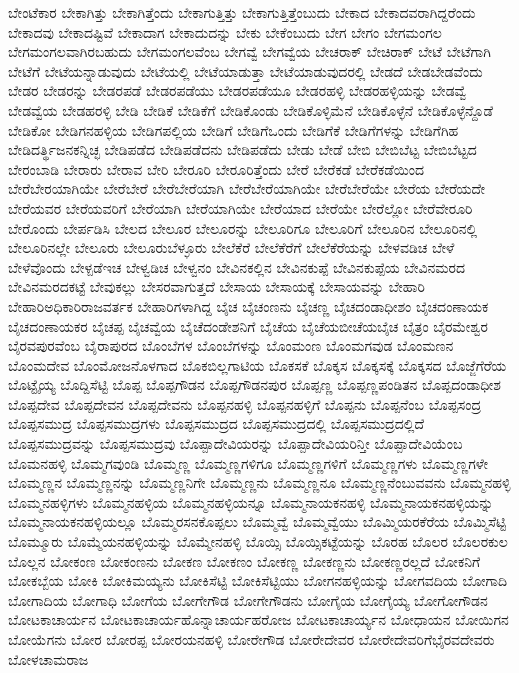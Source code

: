 {ಬೇಂಟೆಕಾರ
ಬೇಕಾಗಿತ್ತು
ಬೇಕಾಗಿತ್ತೆಂದು
ಬೇಕಾಗುತ್ತಿತ್ತು
ಬೇಕಾಗುತ್ತಿತ್ತೆಂಬುದು
ಬೇಕಾದ
ಬೇಕಾದವರಾಗಿದ್ದರೆಂದು
ಬೇಕಾದವು
ಬೇಕಾದಷ್ಟಿವೆ
ಬೇಕಾದಾಗ
ಬೇಕಾದುದನ್ನು
ಬೇಕು
ಬೇಕೆಂಬುದು
ಬೇಗ
ಬೇಗಂ
ಬೇಗಮಂಗಲ
ಬೇಗಮಂಗಲವಾಗಿರಬಹುದು
ಬೇಗಮಂಗಲವೆಂಬ
ಬೇಗವ್ವೆ
ಬೇಗವ್ವೆಯ
ಬೇಚರಾಕ್
ಬೇಚಿರಾಕ್
ಬೇಟೆ
ಬೇಟೆಗಾಗಿ
ಬೇಟೆಗೆ
ಬೇಟೆಯನ್ನಾಡುವುದು
ಬೇಟೆಯಲ್ಲಿ
ಬೇಟೆಯಾಡುತ್ತಾ
ಬೇಟೆಯಾಡುವುದರಲ್ಲಿ
ಬೇಡದೆ
ಬೇಡಬೇಡವೆಂದು
ಬೇಡರ
ಬೇಡರನ್ನು
ಬೇಡರಪಡೆ
ಬೇಡರಪಡೆಯು
ಬೇಡರಪಡೆಯೂ
ಬೇಡರಹಳ್ಳಿ
ಬೇಡರಹಳ್ಳಿಯನ್ನು
ಬೇಡವ್ವೆ
ಬೇಡವ್ವೆಯ
ಬೇಡಹರಳ್ಳಿ
ಬೇಡಿ
ಬೇಡಿಕೆ
ಬೇಡಿಕೆಗೆ
ಬೇಡಿಕೊಂಡು
ಬೇಡಿಕೊಳ್ಳಿಮೆನೆ
ಬೇಡಿಕೊಳ್ಳೆನೆ
ಬೇಡಿಕೊಳ್ಳೆನ್ದೊಡೆ
ಬೇಡಿಕೋ
ಬೇಡಿಗನಹಳ್ಳಿಯ
ಬೇಡಿಗಪಲ್ಲಿಯ
ಬೇಡಿಗೆ
ಬೇಡಿಗೆಒಂದು
ಬೇಡಿಗೆಕೆ
ಬೇಡಿಗೆಗಳನ್ನು
ಬೇಡಿಗೆಗಿಹ
ಬೇಡಿದರ್ತ್ಥಿಜನಕನ್ನಿಚ್ಛ
ಬೇಡಿಪಡೆದ
ಬೇಡಿಪಡೆದನು
ಬೇಡಿಪಡೆದು
ಬೇಡು
ಬೇಡೆ
ಬೇಬಿ
ಬೇಬಿಬೆಟ್ಟ
ಬೇಬಿಬೆಟ್ಟದ
ಬೇರಂಬಾಡಿ
ಬೇರಾರು
ಬೇರಾವ
ಬೇರಿ
ಬೇರೂರಿ
ಬೇರೂರಿತ್ತೆಂದು
ಬೇರೆ
ಬೇರೆಕಡೆ
ಬೇರೆಕಡೆಯಿಂದ
ಬೇರೆಬೇರಯಾಗಿಯೇ
ಬೇರೆಬೇರೆ
ಬೇರೆಬೇರೆಯಾಗಿ
ಬೇರೆಬೇರೆಯಾಗಿಯೇ
ಬೇರೆಬೇರೆಯೇ
ಬೇರೆಯ
ಬೇರೆಯದೇ
ಬೇರೆಯವರ
ಬೇರೆಯವರಿಗೆ
ಬೇರೆಯಾಗಿ
ಬೇರೆಯಾಗಿಯೇ
ಬೇರೆಯಾದ
ಬೇರೆಯೇ
ಬೇರೆಲ್ಲೋ
ಬೇರೆವೇರೂರಿ
ಬೇರೊಂದು
ಬೇರ್ಪಡಿಸಿ
ಬೇಲದ
ಬೇಲೂರ
ಬೇಲೂರನ್ನು
ಬೇಲೂರಿಗೂ
ಬೇಲೂರಿಗೆ
ಬೇಲೂರಿನ
ಬೇಲೂರಿನಲ್ಲಿ
ಬೇಲೂರಿನಲ್ಲೇ
ಬೇಲೂರು
ಬೇಲೂರುಬೆಳ್ಳೂರು
ಬೇಲೆಕೆರೆ
ಬೇಲೆಕೆರೆಗೆ
ಬೇಲೆಕೆರೆಯನ್ನು
ಬೇಳವಡಿಚ
ಬೇಳೆ
ಬೇಳೆವೊಂದು
ಬೇಳ್ಪಡೆಇಚ
ಬೇಳ್ವಡಿಚ
ಬೇಳ್ವನಂ
ಬೇವಿನಕಲ್ಲಿನ
ಬೇವಿನಕುಪ್ಪೆ
ಬೇವಿನಕುಪ್ಪೆಯ
ಬೇವಿನಮರದ
ಬೇವಿನಮರದಕಟ್ಟೆ
ಬೇವುಕಲ್ಲು
ಬೇಸರವಾಗುತ್ತದೆ
ಬೇಸಾಯ
ಬೇಸಾಯಕ್ಕೆ
ಬೇಸಾಯವನ್ನು
ಬೇಹಾರಿ
ಬೇಹಾರಿಅಧಿಕಾರಿರಾಜವರ್ತಕ
ಬೇಹಾರಿಗಳಾಗಿದ್ದ
ಬೈಚ
ಬೈಚಂಣನು
ಬೈಚಣ್ಣ
ಬೈಚದಂಡಾಧೀಶಂ
ಬೈಚದಂಣಾಯಕ
ಬೈಚದಂಣಾಯಕರ
ಬೈಚಪ್ಪ
ಬೈಚವ್ವೆಯ
ಬೈಚೆದಂಡೇಶನಿಗೆ
ಬೈಚೆಯ
ಬೈಚೆಯಬೀಚೆಯಬೈಚ
ಬೈತ್ರಂ
ಬೈರಮೇಶ್ವರ
ಬೈರವಪುರವೆಂಬ
ಬೈರಾಪುರದ
ಬೊಂಬೆಗಳ
ಬೊಂಬೆಗಳನ್ನು
ಬೊಂಮಂಣ
ಬೊಂಮಗವುಡ
ಬೊಂಮಣನ
ಬೊಂಮದೇವ
ಬೊಂಮೋಜನೊಳಗಾದ
ಬೊಕಬಿಲ್ಲಗಾಟಿಯ
ಬೊಕಸಕೆ
ಬೊಕ್ಕಸ
ಬೊಕ್ಕಸಕ್ಕೆ
ಬೊಕ್ಕಸದ
ಬೊಜ್ಜೆಗೆರೆಯ
ಬೊಟ್ಟೈಯ್ಯ
ಬೊದ್ದಿಸೆಟ್ಟಿ
ಬೊಪ್ಪ
ಬೊಪ್ಪಗೌಡನ
ಬೊಪ್ಪಗೌಡನಪುರ
ಬೊಪ್ಪಣ್ಣ
ಬೊಪ್ಪಣ್ಣಪಂಡಿತನ
ಬೊಪ್ಪದಂಡಾಧೀಶ
ಬೊಪ್ಪದೇವ
ಬೊಪ್ಪದೇವನ
ಬೊಪ್ಪದೇವನು
ಬೊಪ್ಪನಹಳ್ಳಿ
ಬೊಪ್ಪನಹಳ್ಳಿಗೆ
ಬೊಪ್ಪನು
ಬೊಪ್ಪನೆಂಬ
ಬೊಪ್ಪಸಂದ್ರ
ಬೊಪ್ಪಸಮುದ್ರ
ಬೊಪ್ಪಸಮುದ್ರಗಳು
ಬೊಪ್ಪಸಮುದ್ರದ
ಬೊಪ್ಪಸಮುದ್ರದಲ್ಲಿ
ಬೊಪ್ಪಸಮುದ್ರದಲ್ಲಿದೆ
ಬೊಪ್ಪಸಮುದ್ರವನ್ನು
ಬೊಪ್ಪಸಮುದ್ರವು
ಬೊಪ್ಪಾದೇವಿಯರನ್ನು
ಬೊಪ್ಪಾದೇವಿಯರಿನ್ತೀ
ಬೊಪ್ಪಾದೇವಿಯೆಂಬ
ಬೊಮನಹಳ್ಳಿ
ಬೊಮ್ಮಗವುಂಡಿ
ಬೊಮ್ಮಣ್ಣ
ಬೊಮ್ಮಣ್ಣಗಳಿಗೂ
ಬೊಮ್ಮಣ್ಣಗಳಿಗೆ
ಬೊಮ್ಮಣ್ಣಗಳು
ಬೊಮ್ಮಣ್ಣಗಳೇ
ಬೊಮ್ಮಣ್ಣನ
ಬೊಮ್ಮಣ್ಣನನ್ನು
ಬೊಮ್ಮಣ್ಣನಿಗೇ
ಬೊಮ್ಮಣ್ಣನು
ಬೊಮ್ಮಣ್ಣನೂ
ಬೊಮ್ಮಣ್ಣನೆಂಬುವವನು
ಬೊಮ್ಮನಹಳ್ಳಿ
ಬೊಮ್ಮನಹಳ್ಳಿಗಳು
ಬೊಮ್ಮನಹಳ್ಳಿಯ
ಬೊಮ್ಮನಹಳ್ಳಿಯನ್ನೂ
ಬೊಮ್ಮನಾಯಕನಹಳ್ಳಿ
ಬೊಮ್ಮನಾಯಕನಹಳ್ಳಿಯನ್ನು
ಬೊಮ್ಮನಾಯಕನಹಳ್ಳಿಯಲ್ಲೂ
ಬೊಮ್ಮರಸನಕೊಪ್ಪಲು
ಬೊಮ್ಮವ್ವೆ
ಬೊಮ್ಮವ್ವೆಯು
ಬೊಮ್ಮಿಯರಕೆರೆಯ
ಬೊಮ್ಮಿಸೆಟ್ಟಿ
ಬೊಮ್ಮೂರು
ಬೊಮ್ಮೆಯನಹಳ್ಳಿಯನ್ನು
ಬೊಮ್ಮೇನಹಳ್ಳಿ
ಬೊಯ್ಸಿ
ಬೊಯ್ಸಿಕಟ್ಟೆಯನ್ನು
ಬೊರಹ
ಬೊಲರ
ಬೊಲರಕುಲ
ಬೊಲ್ಲನ
ಬೋಕಂಣ
ಬೋಕಂಣನು
ಬೋಕಣ
ಬೋಕಣಂ
ಬೋಕಣ್ಣ
ಬೋಕಣ್ಣನು
ಬೋಕಣ್ಣರಲ್ಲದೆ
ಬೋಕನಿಗೆ
ಬೋಕಬ್ಬೆಯ
ಬೋಕಿ
ಬೋಕಿಮಯ್ಯನು
ಬೋಕಿಸೆಟ್ಟಿ
ಬೋಕಿಸೆಟ್ಟಿಯು
ಬೋಗನಹಳ್ಳಿಯನ್ನು
ಬೋಗವದಿಯ
ಬೋಗಾದಿ
ಬೋಗಾದಿಯ
ಬೋಗಾಧಿ
ಬೋಗೆಯ
ಬೋಗೇಗೌಡ
ಬೋಗೇಗೌಡನು
ಬೋಗೈಯ
ಬೋಗೈಯ್ಯ
ಬೋಗೋಗೌಡನ
ಬೋಟಕಾಚಾರ್ಯನ
ಬೋಟಕಾಚಾರ್ಯಹೊನ್ನಾಚಾರ್ಯಹರೋಜ
ಬೋಟಕಾಚಾರ್ಯ್ಯನ
ಬೋಧಾಯನ
ಬೋಯಿಗನ
ಬೋಯೆಗನು
ಬೋರ
ಬೋರಪ್ಪ
ಬೋರಯನಹಳ್ಳಿ
ಬೋರೇಗೌಡ
ಬೋರೇದೇವರ
ಬೋರೇದೇವರಿಗೆಭೈರವದೇವರು
ಬೋಳಚಾಮರಾಜ
}
